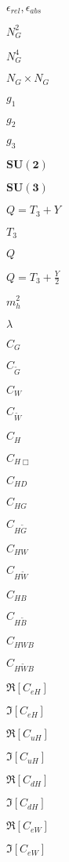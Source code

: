 \documentclass{article}
\begin{document}
$\epsilon_{rel}, \epsilon_{abs}$
\pagebreak

$N_G ^2$
\pagebreak

$N_G ^4$
\pagebreak

$N_G \times N_G$
\pagebreak

$g_1$
\pagebreak

$g_2$
\pagebreak

$g_3$
\pagebreak

$\mathbf{SU(2)}$
\pagebreak

$\mathbf{SU(3)}$
\pagebreak

$Q = T_3 + Y $
\pagebreak

$T_3$
\pagebreak

$Q$
\pagebreak

$Q = T_3 + \frac{Y}{2} $
\pagebreak

$m_h ^2 $
\pagebreak

$ \lambda $
\pagebreak

$ C_G$
\pagebreak

$ C_{\tilde{G}}$
\pagebreak

$ C_W$
\pagebreak

$ C_{\tilde{W}} $
\pagebreak

$C_H$
\pagebreak

$C_{H \Box} $
\pagebreak

$C_{H D} $
\pagebreak

$C_{H G} $
\pagebreak

$C_{H \tilde{G}} $
\pagebreak

$C_{H W} $
\pagebreak

$C_{H \tilde{W}} $
\pagebreak

$C_{H B} $
\pagebreak

$C_{H \tilde{B}} $
\pagebreak

$C_{H WB} $
\pagebreak

$C_{H \tilde{W} B} $
\pagebreak

$ \Re \left[ C_{eH } \right]$
\pagebreak

$ \Im \left[ C_{eH } \right]$
\pagebreak

$ \Re \left[ C_{uH } \right]$
\pagebreak

$ \Im \left[ C_{uH } \right]$
\pagebreak

$ \Re \left[ C_{dH } \right]$
\pagebreak

$ \Im \left[ C_{dH } \right]$
\pagebreak

$ \Re \left[ C_{eW } \right]$
\pagebreak

$ \Im \left[ C_{eW } \right]$
\pagebreak
\end{document}
